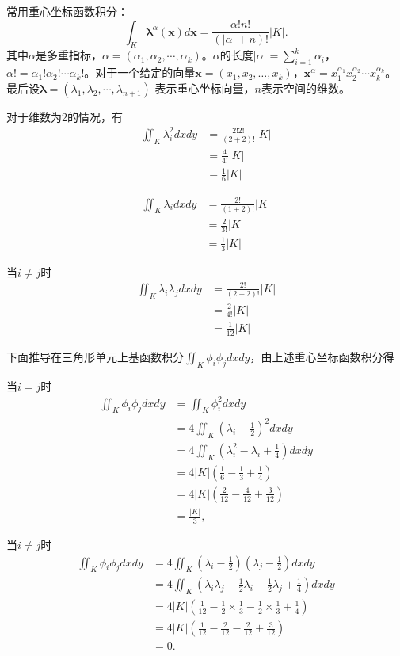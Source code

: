 \documentclass{ctexart}
\begin{document}
常用重心坐标函数积分：
\begin{equation}
    \int _K \boldsymbol{\lambda} ^\alpha (\boldsymbol{x})d\boldsymbol{x} = 
    \frac{\alpha!n!}{(|\alpha|+ n)!} |K|.
\end{equation}
其中$\alpha$是多重指标，$\alpha = (\alpha_1,\alpha_2,\cdots,\alpha_k)$。$\alpha$的长度$|\alpha|=\sum_{i=1}^{k}\alpha _i $，
$\alpha! = \alpha_1!\alpha_2!\cdots \alpha_k!$。对于一个给定的向量$\boldsymbol{x}=(x_1,x_2,\dots,x_k)$，$\boldsymbol{x}^\alpha
= x_1^{\alpha_1}x_2^{\alpha_2}\cdots x_k^{\alpha_k}$。最后设$\boldsymbol{\lambda}=(\lambda_1,\lambda_2,\cdots,\lambda_{n+1})$
表示重心坐标向量，$n$表示空间的维数。

对于维数为2的情况，有
\begin{align*}
    \iint_K \lambda _i^2dxdy & = \frac{2!2!}{(2+2)!} |K| \\
    & = \frac{4}{4!}|K|\\
    & = \frac{1}{6}|K|  
\end{align*}

\begin{align*}
    \iint_K \lambda _idxdy & = \frac{2!}{(1+2)!} |K| \\
    & = \frac{2}{3!}|K|\\
    & = \frac{1}{3}|K|  
\end{align*}

当$i \neq j$时
\begin{align*}
    \iint_K \lambda _i \lambda _jdxdy  & = \frac{2!}{(2+2)!} |K| \\
    & = \frac{2}{4!}|K|\\
    & = \frac{1}{12}|K|
\end{align*}

下面推导在三角形单元上基函数积分$\iint_K \phi_i\phi_jdxdy$，由上述重心坐标函数积分得

当$i=j$时
\begin{align*}
    \iint_K \phi _i \phi_jdxdy  & = \iint_K \phi _i^2dxdy \\
    & = 4\iint_K(\lambda _i - \frac{1}{2})^2dxdy\\
    & = 4\iint_K(\lambda _i^2 -\lambda _i+ \frac{1}{4} )dxdy\\
    & = 4|K|(\frac{1}{6}-\frac{1}{3} + \frac{1}{4})\\
    & = 4|K|(\frac{2}{12}-\frac{4}{12} + \frac{3}{12})\\
    & = \frac{|K|}{3},
\end{align*}

当$i \neq j$时
\begin{align*}
    \iint_K \phi _i \phi_jdxdy  & = 4\iint_K(\lambda _i - \frac{1}{2})(\lambda _j - \frac{1}{2})dxdy \\
    & = 4\iint_K(\lambda _i\lambda _j - \frac{1}{2}\lambda _i - \frac{1}{2}\lambda _j + \frac{1}{4})dxdy\\
    & = 4|K|(\frac{1}{12}-\frac{1}{2} \times \frac{1}{3} -\frac{1}{2} \times \frac{1}{3} + \frac{1}{4})\\
    & = 4|K|(\frac{1}{12}-\frac{2}{12} -\frac{2}{12} + \frac{3}{12})\\
    & = 0.
\end{align*}
\end{document}
